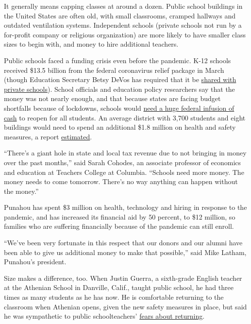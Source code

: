 It generally means capping classes at around a dozen. Public school
buildings in the United States are often old, with small classrooms,
cramped hallways and outdated ventilation systems. Independent schools
(private schools not run by a for-profit company or religious
organization) are more likely to have smaller class sizes to begin with,
and money to hire additional teachers.

Public schools faced a funding crisis even before the pandemic. K-12
schools received \$13.5 billion from the federal coronavirus relief
package in March (though Education Secretary Betsy DeVos has required
that it be
\href{https://www.nytimes.com/2020/05/15/us/politics/betsy-devos-coronavirus-religious-schools.html}{shared
with private schools}). School officials and education policy
researchers say that the money was not nearly enough, and that because
states are facing budget shortfalls because of lockdowns, schools would
\href{https://www.nytimes.com/2020/07/09/us/schools-reopening-trump.html}{need
a huge federal infusion of cash} to reopen for all students. An average
district with 3,700 students and eight buildings would need to spend an
additional \$1.8 million on health and safety measures, a report
\href{https://www.asumag.com/covid-19/article/21133640/reopening-means-an-additional-18-million-in-costs-for-averagesized-school-district-administrators-estimate}{estimated}.

``There's a giant hole in state and local tax revenue due to not
bringing in money over the past months,'' said Sarah Cohodes, an
associate professor of economics and education at Teachers College at
Columbia. ``Schools need more money. The money needs to come tomorrow.
There's no way anything can happen without the money.''

Punahou has spent \$3 million on health, technology and hiring in
response to the pandemic, and has increased its financial aid by 50
percent, to \$12 million, so families who are suffering financially
because of the pandemic can still enroll.

``We've been very fortunate in this respect that our donors and our
alumni have been able to give us additional money to make that
possible,'' said Mike Latham, Punahou's president.

Size makes a difference, too. When Justin Guerra, a sixth-grade English
teacher at the Athenian School in Danville, Calif., taught public
school, he had three times as many students as he has now. He is
comfortable returning to the classroom when Athenian opens, given the
new safety measures in place, but said he was sympathetic to public
schoolteachers'
\href{https://www.nytimes.com/2020/07/11/us/virus-teachers-classrooms.html}{fears
about returning}.

